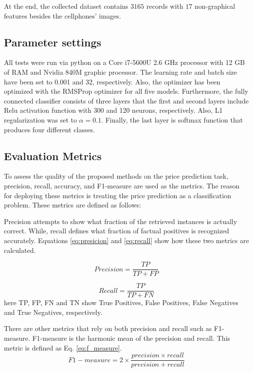 \documentclass{svjour3}                     \smartqed  \usepackage{graphicx}
\begin{document}
At the end, the collected dataset contains $3165$ records with $17$ non-graphical features besides the cellphones' images.


\subsection{Parameter settings}
All tests were run via python on a Core i7-5600U 2.6 GHz processor with 12 GB of RAM and Nvidia 840M graphic processor. The learning rate and batch size have been set to 0.001 and 32, respectively. Also, the optimizer has been optimized with the RMSProp optimizer for all five models. Furthermore, the fully connected classifier consists of three layers that the first and second layers include Relu activation function with 300 and 120 neurons, respectively. Also, L1 regularization was set to $\alpha = 0.1$. Finally, the last layer is softmax function that produces four different classes.


\subsection{Evaluation Metrics}
To assess the quality of the proposed methods on the price prediction task, precision, recall, accuracy, and F1-measure are used as the metrics. The reason for deploying these metrics is treating the price prediction as a classification problem. These metrics are defined as follows:

Precision attempts to show what fraction of the retrieved instances is actually correct. While, recall defines
what fraction of factual positives is recognized accurately. Equations \ref{eq:presicion} and \ref{eq:recall}
show how these two metrics are calculated.

\begin{equation}
    Precision = \frac{TP}{TP + FP}
    \label{eq:presicion}
\end{equation}

\begin{equation}
    Recall = \frac{TP}{TP + FN}
    \label{eq:recall}
\end{equation}
here TP, FP, FN and TN show True Positives, False Positives, False Negatives and True Negatives, respectively. 

There are other metrics that rely on both precision and recall such as F1-measure. F1-measure is the harmonic mean of the precision and recall. This metric is defined as Eq. \ref{eq:f_measure}.   
\begin{equation}
    F1-measure = 2 \times \frac{precision \times recall}{precision + recall}
    \label{eq:f_measure}
\end{equation}
\end{document}
